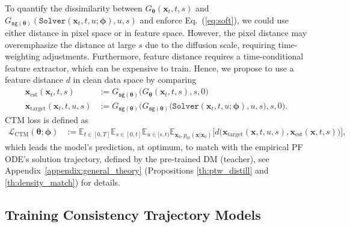 \documentclass{article} \usepackage{iclr2024_coNFErence,times}
\def\eqref#1{equation~\ref{#1}}
\def\eqref#1{(\ref{#1})}
\def\eqref#1{(\ref{#1})}
\theoremstyle{definition}
\theoremstyle{remark}
\begin{document}
To quantify the dissimilarity between $G_{\bm{\theta}}(\mathbf{x}_{t},t,s)$ and $G_{\texttt{sg}(\bm{\theta})}(\texttt{Solver}(\mathbf{x}_t, t,u;\bm{\phi}),u,s)$ and enforce Eq.~\eqref{eq:soft}, we could use either  distance in pixel space or in feature space. However, the pixel distance may overemphasize the distance at large $s$ due to the diffusion scale, requiring time-weighting adjustments. Furthermore, feature distance requires a time-conditional feature extractor, which can be expensive to train. Hence, we propose to use a feature distance $d$ in clean data space by comparing
\begin{align}
    \mathbf{x}_{\text{est}}(\mathbf{x}_{t},t,s)&:=G_{\texttt{sg}(\bm{\theta})}\Big(G_{\bm{\theta}}(\mathbf{x}_{t},t,s),s,0\Big)\nonumber
    \\ \mathbf{x}_{\text{target}}(\mathbf{x}_{t},t,u,s)&:=G_{\texttt{sg}(\bm{\theta})}\Big(G_{\texttt{sg}(\bm{\theta})}\big(\texttt{Solver}(\mathbf{x}_t, t,u;\bm{\phi}),u,s\big),s,0\Big)\label{eq:target}.
\end{align}
CTM loss is defined as
\begin{align}\label{eq:ctm_loss}
    \mathcal{L}_{\text{CTM}}(\bm{\theta};\bm{\phi})&:=\mathbb{E}_{t\in[0,T]}\mathbb{E}_{s\in[0,t]}\mathbb{E}_{u\in[s,t)}\mathbb{E}_{\mathbf{x}_{0},p_{0t}(\mathbf{x}\vert\mathbf{x}_{0})}\Big[d\big(\mathbf{x}_{\text{target}}(\mathbf{x},t,u,s),\mathbf{x}_{\text{est}}(\mathbf{x},t,s)\big)\Big],
\end{align}
which leads the model's prediction, at optimum, to match with the empirical PF ODE's solution trajectory, defined by the pre-trained DM (teacher), see Appendix~\ref{appendix:general_theory} (Propositions \ref{th:ptw_distill} and \ref{th:density_match}) for details.

\subsection{Training Consistency Trajectory Models}
\end{document}
